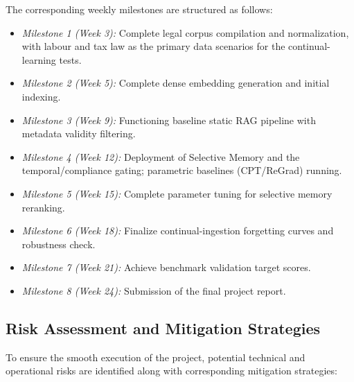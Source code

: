 The corresponding weekly milestones are structured as follows:
\begin{itemize}
    \item \textit{Milestone 1 (Week 3):} Complete legal corpus compilation and normalization, with labour and tax law as the primary data scenarios for the continual-learning tests.
    \item \textit{Milestone 2 (Week 5):} Complete dense embedding generation and initial indexing.
    \item \textit{Milestone 3 (Week 9):} Functioning baseline static RAG pipeline with metadata validity filtering.
    \item \textit{Milestone 4 (Week 12):} Deployment of Selective Memory and the temporal/compliance gating; parametric baselines (CPT/ReGrad) running.
    \item \textit{Milestone 5 (Week 15):} Complete parameter tuning for selective memory reranking.
    \item \textit{Milestone 6 (Week 18):} Finalize continual-ingestion forgetting curves and robustness check.
    \item \textit{Milestone 7 (Week 21):} Achieve benchmark validation target scores.
    \item \textit{Milestone 8 (Week 24):} Submission of the final project report.
\end{itemize}

\subsection{Risk Assessment and Mitigation Strategies}
To ensure the smooth execution of the project, potential technical and operational risks are identified along with corresponding mitigation strategies:

